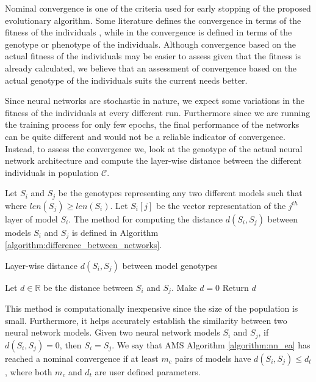 \documentclass[12pt]{elsart}%
\begin{document}
Nominal convergence is one of the criteria used for early stopping of the proposed evolutionary algorithm. Some literature defines the convergence in terms of the fitness of the individuals \cite{Engelbrecht2007}, while in \cite{Krishnakumar1989} the convergence is defined in terms of the genotype or phenotype of the individuals. Although convergence based on the actual fitness of the individuals may be easier to assess given that the fitness is already calculated, we believe that an assessment of convergence based on the actual genotype of the individuals suits the current needs better.

Since neural networks are stochastic in nature, we expect some variations in the fitness of the individuals at every different run. Furthermore since we are running the training process for only few epochs, the final performance of the networks can be quite different and would not be a reliable indicator of convergence. Instead, to assess the convergence we, look at the genotype of the actual neural network architecture and compute the layer-wise distance between the different individuals in population $\mathcal{C}$.

Let $S_i$ and $S_j$ be the genotypes representing any two different models such that  where $len(S_j) \ge len(S_i)$. Let $S_i[j]$ be the vector representation of the $j^{th}$ layer of model $S_i$. The method for computing the distance $d(S_i, S_j)$ between models $S_i$ and $S_j$ is defined in Algorithm \ref{algorithm:difference_between_networks}.

\begin{algorithm}[!htb]
\caption{Layer-wise distance $d(S_i, S_j)$ between model genotypes}
\begin{algorithmic}[0]
\State Let $d \in \mathbb{R}$ be the distance between $S_i$ and $S_j$. Make $d = 0$
\EndFor
{} 
\EndFor
\State Return $d$
\end{algorithmic}
\label{algorithm:difference_between_networks}
\end{algorithm}

This method is computationally inexpensive since the size of the population is small. Furthermore, it helps accurately establish the similarity between two neural network models. Given two neural network models $S_i$ and $S_j$, if $d(S_i, S_j) = 0$, then $S_i = S_j$. We say that AMS Algorithm \ref{algorithm:nn_ea} has reached a nominal convergence if at least $m_c$ pairs of models have $d(S_i, S_j) \leq d_t$, where both $m_c$ and $d_t$ are user defined parameters.
\end{document}
